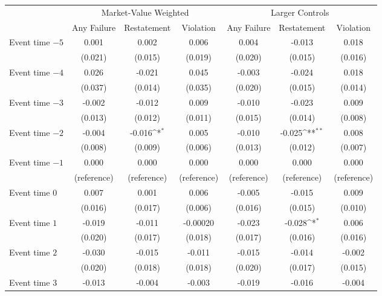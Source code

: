 \documentclass[10pt]{article}
\newcommand{\sym}[1]{\textsuperscript{#1}}
\begin{document}
\begin{minipage}{19cm}\fontsize{10}{12}\selectfont\setlength{\tabcolsep}{4pt}\renewcommand{\arraystretch}{1.15}


\def\sym#1{\ifmmode^{#1}\else\(^{#1}\)\fi}
\centering
{}
\label{tab:big4-eventstudy-robustness}
\begin{threeparttable}

\begin{tabular}{l c c c c c c }
\toprule
 & \multicolumn{3}{c}{Market-Value Weighted} & \multicolumn{3}{c}{Larger Controls} \\
\cmidrule(lr){2-4}\cmidrule(lr){5-7}
 & Any Failure & Restatement & Violation & Any Failure & Restatement & Violation \\
\midrule
Event time $-5$ & 0.001 & 0.002 & 0.006 & 0.004 & -0.013 & 0.018 \\
 & (0.021) & (0.015) & (0.019) & (0.020) & (0.015) & (0.016) \\
Event time $-4$ & 0.026 & -0.021 & 0.045 & -0.003 & -0.024 & 0.018 \\
 & (0.037) & (0.014) & (0.035) & (0.020) & (0.015) & (0.014) \\
Event time $-3$ & -0.002 & -0.012 & 0.009 & -0.010 & -0.023 & 0.009 \\
 & (0.013) & (0.012) & (0.011) & (0.015) & (0.014) & (0.008) \\
Event time $-2$ & -0.004 & -0.016\sym{*} & 0.005 & -0.010 & -0.025\sym{**} & 0.008 \\
 & (0.008) & (0.009) & (0.006) & (0.013) & (0.012) & (0.007) \\
Event time $-1$ & 0.000 & 0.000 & 0.000 & 0.000 & 0.000 & 0.000 \\
 & (reference) & (reference) & (reference) & (reference) & (reference) & (reference) \\
Event time $0$ & 0.007 & 0.001 & 0.006 & -0.005 & -0.015 & 0.009 \\
 & (0.016) & (0.017) & (0.006) & (0.016) & (0.015) & (0.010) \\
Event time $1$ & -0.019 & -0.011 & -0.00020 & -0.023 & -0.028\sym{*} & 0.006 \\
 & (0.020) & (0.017) & (0.018) & (0.017) & (0.016) & (0.016) \\
Event time $2$ & -0.030 & -0.015 & -0.011 & -0.015 & -0.014 & -0.002 \\
 & (0.020) & (0.018) & (0.018) & (0.020) & (0.017) & (0.015) \\
Event time $3$ & -0.013 & -0.004 & -0.003 & -0.019 & -0.016 & -0.004 \\

\end{tabular}
\end{threeparttable}
\end{minipage}
\end{document}
